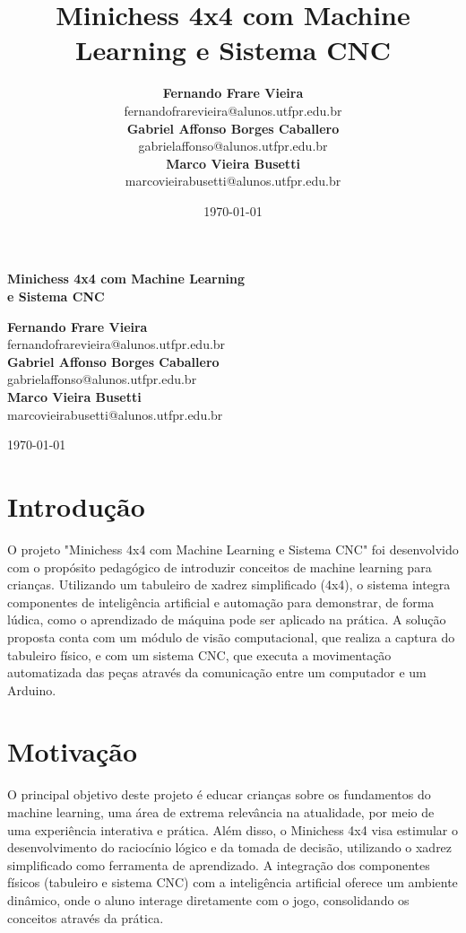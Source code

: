 \documentclass[a4paper,12pt]{article}
\title{\textbf{Minichess 4x4 com Machine Learning e Sistema CNC}}
\author{%
    \textbf{Fernando Frare Vieira} \\
    fernandofrarevieira@alunos.utfpr.edu.br \\[1.5em]
    \textbf{Gabriel Affonso Borges Caballero} \\
    gabrielaffonso@alunos.utfpr.edu.br \\[1.5em]
    \textbf{Marco Vieira Busetti} \\
    marcovieirabusetti@alunos.utfpr.edu.br
}
\date{\today}
\begin{document}
\vspace{1em}

\begin{center}
    \Large\textbf{Minichess 4x4 com Machine Learning \\e Sistema CNC}
\end{center}

\vspace{1em}

\begin{center}
    \textbf{Fernando Frare Vieira} \\
    fernandofrarevieira@alunos.utfpr.edu.br \\[1.5em]
    \textbf{Gabriel Affonso Borges Caballero} \\
    gabrielaffonso@alunos.utfpr.edu.br \\[1.5em]
    \textbf{Marco Vieira Busetti} \\
    marcovieirabusetti@alunos.utfpr.edu.br
\end{center}

\vspace{2em}

\begin{center}
    \today
\end{center}

\vspace{2em}

\section{Introdução}
O projeto "Minichess 4x4 com Machine Learning e Sistema CNC" foi desenvolvido com o propósito pedagógico de introduzir conceitos de machine learning para crianças. Utilizando um tabuleiro de xadrez simplificado (4x4), o sistema integra componentes de inteligência artificial e automação para demonstrar, de forma lúdica, como o aprendizado de máquina pode ser aplicado na prática. A solução proposta conta com um módulo de visão computacional, que realiza a captura do tabuleiro físico, e com um sistema CNC, que executa a movimentação automatizada das peças através da comunicação entre um computador e um Arduino.

\section{Motivação}
O principal objetivo deste projeto é educar crianças sobre os fundamentos do machine learning, uma área de extrema relevância na atualidade, por meio de uma experiência interativa e prática. Além disso, o Minichess 4x4 visa estimular o desenvolvimento do raciocínio lógico e da tomada de decisão, utilizando o xadrez simplificado como ferramenta de aprendizado. A integração dos componentes físicos (tabuleiro e sistema CNC) com a inteligência artificial oferece um ambiente dinâmico, onde o aluno interage diretamente com o jogo, consolidando os conceitos através da prática.
\end{document}
